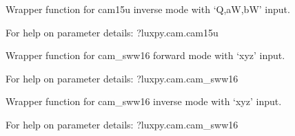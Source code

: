 \documentclass[letterpaper,10pt,english]{sphinxmanual}
\begin{document}

\begin{fulllineitems}
\label{\detokenize{color:luxpy.color.cam.qabW_cam15u_to_xyz}}
Wrapper function for cam15u inverse mode with ‘Q,aW,bW’ input.

\begin{DUlineblock}{0em}
\item[] For help on parameter details: ?luxpy.cam.cam15u
\end{DUlineblock}

\end{fulllineitems}


\begin{fulllineitems}
\label{\detokenize{color:luxpy.color.cam.xyz_to_lab_cam_sww16}}
Wrapper function for cam\_sww16 forward mode with ‘xyz’ input.

\begin{DUlineblock}{0em}
\item[] For help on parameter details: ?luxpy.cam.cam\_sww16
\end{DUlineblock}

\end{fulllineitems}


\begin{fulllineitems}
\label{\detokenize{color:luxpy.color.cam.lab_cam_sww16_to_xyz}}
Wrapper function for cam\_sww16 inverse mode with ‘xyz’ input.

\begin{DUlineblock}{0em}
\item[] For help on parameter details: ?luxpy.cam.cam\_sww16
\end{DUlineblock}

\end{fulllineitems}
\end{document}
